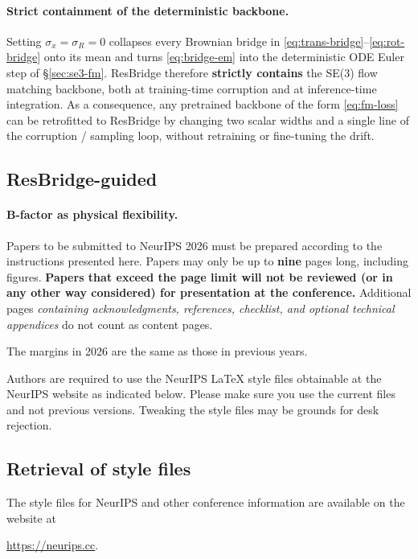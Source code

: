\documentclass{article}
\begin{document}
\paragraph{Strict containment of the deterministic backbone.}
Setting $\sigma_x=\sigma_R=0$ collapses every Brownian bridge in \eqref{eq:trans-bridge}--\eqref{eq:rot-bridge} onto its mean and turns \eqref{eq:bridge-em} into the deterministic ODE Euler step of \S\ref{sec:se3-fm}. ResBridge therefore \textbf{strictly contains} the SE(3) flow matching backbone, both at training-time corruption and at inference-time integration. As a consequence, any pretrained backbone of the form \eqref{eq:fm-loss} can be retrofitted to ResBridge by changing two scalar widths and a single line of the corruption / sampling loop, without retraining or fine-tuning the drift.

\subsection{ResBridge-guided}\label{sec:resbridge-guided}


\paragraph{B-factor as physical flexibility.}



Papers to be submitted to NeurIPS 2026 must be prepared according to the
instructions presented here. Papers may only be up to {\bf nine} pages long, including figures. \textbf{Papers that exceed the page limit will not be reviewed (or in any other way considered) for presentation at the conference.}
Additional pages \emph{containing acknowledgments, references, checklist, and optional technical appendices} do not count as content pages. 


The margins in 2026 are the same as those in previous years.


Authors are required to use the NeurIPS \LaTeX{} style files obtainable at the NeurIPS website as indicated below. Please make sure you use the current files and not previous versions. Tweaking the style files may be grounds for desk rejection.


\subsection{Retrieval of style files}


The style files for NeurIPS and other conference information are available on the website at
\begin{center}
  \url{https://neurips.cc}.
\end{center}
\end{document}
